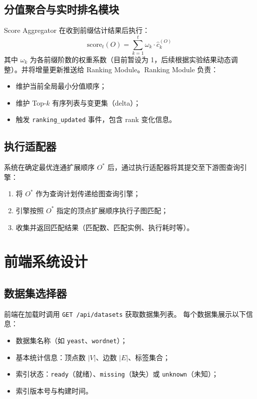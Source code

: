 \documentclass[12pt,a4paper]{article}
\begin{document}
\subsection{分值聚合与实时排名模块}
\label{sec:score-ranking}

Score Aggregator 在收到前缀估计结果后执行：
\[
\mathrm{score}_t(O) = \sum_{k=1}^{t} \omega_k \cdot \hat{c}^{(O)}_k
\]
其中 $\omega_k$ 为各前缀阶数的权重系数（目前暂设为 1，后续根据实验结果动态调整）。并将增量更新推送给 Ranking Module。Ranking Module 负责：
\begin{itemize}
  \item 维护当前全局最小分值顺序；
  \item 维护 Top-$k$ 有序列表与变更集（delta）；
  \item 触发 \texttt{ranking\_updated} 事件，包含 rank 变化信息。
\end{itemize}

\subsection{执行适配器}
\label{sec:execution-adapter}

系统在确定最优连通扩展顺序 $O^*$ 后，通过执行适配器将其提交至下游图查询引擎：
\begin{enumerate}
  \item 将 $O^*$ 作为查询计划传递给图查询引擎；
  \item 引擎按照 $O^*$ 指定的顶点扩展顺序执行子图匹配；
  \item 收集并返回匹配结果（匹配数、匹配实例、执行耗时等）。
\end{enumerate}


\section{前端系统设计}
\label{sec:frontend}

\subsection{数据集选择器}

前端在加载时调用 \texttt{GET /api/datasets} 获取数据集列表。
每个数据集展示以下信息：
\begin{itemize}
  \item 数据集名称（如 \texttt{yeast}、\texttt{wordnet}）；
  \item 基本统计信息：顶点数 $|V|$、边数 $|E|$、标签集合；
  \item 索引状态：\texttt{ready}（就绪）、\texttt{missing}（缺失）或 \texttt{unknown}（未知）；
  \item 索引版本号与构建时间。
\end{itemize}
\end{document}
